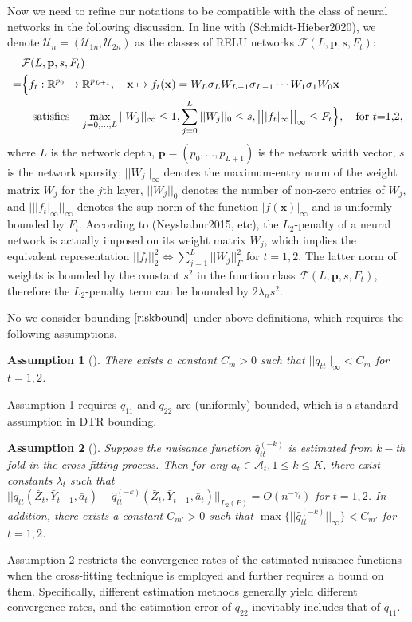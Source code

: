 \documentclass[10pt]{article}
\newtheorem{ass}{Assumption}
\theoremstyle{remark} \newtheorem{rem}{Remark}
\begin{document}
Now we need to refine our notations to be compatible with the class of neural networks in the following discussion.
In line with (Schmidt-Hieber2020), we denote $\mathcal{U}_n=(\mathcal{U}_{1n},\mathcal{U}_{2n})$ as the classes of RELU networks $\mathcal{F}(L,\mathbf{p},s,F_{t})$:
\begin{align}
    &\mathcal{F}(L,\mathbf{p},s,F_{t}) \notag\\
    =& \Big\{f_{t}: \mathbb{R}^{p_0}\to\mathbb{R}^{p_{L+1}},\quad \mathbf{x} \mapsto f_t(\mathbf{x})=W_L\sigma_L W_{L-1}\sigma_{L-1} \cdots W_1\sigma_1W_0\mathbf{x} \\
    &\text{\quad satisfies\quad} \max_{j=0,\dots,L}||W_j||_\infty \leq 1, \sum_{j=0}^L||W_j||_0 \leq s, \big|\big| |f_t|_\infty \big|\big|_{\infty} \leq F_t \Big\}, \text{\quad for $t$=1,2},
\end{align}
where $L$ is the network depth, $\mathbf{p}=(p_0,\dots,p_{L+1})$ is the network width vector, $s$ is the network sparsity;
$||W_j||_\infty$ denotes the maximum-entry norm of the weight matrix $W_j$ for the $j$th layer, $||W_j||_0$ denotes the number of non-zero entries of $W_j$, and $\big|\big| |f_t|_\infty \big|\big|_{\infty}$ denotes the sup-norm of the function $|f(\mathbf{x})|_\infty$ and is uniformly bounded by $F_t$.
According to (Neyshabur2015, etc), the $L_2$-penalty of a neural network is actually imposed on its weight matrix $W_j$, which implies the equivalent representation $|| f_{t}||_{2}^2  \Longleftrightarrow \sum\limits_{j=1}^L ||W_j||_F^2$ for $t=1,2$.
The latter norm of weights is bounded by the constant $s^2$ in the function class $\mathcal{F}(L,\mathbf{p},s,F_{t})$, therefore the $L_2$-penalty term can be bounded by $2\lambda_ns^2$.



No we consider bounding $\eqref{riskbound}$ under above definitions, which requires the following assumptions.
\begin{ass}[]
    There exists a constant $C_m > 0$ such that $||q_{tt}||_\infty < C_m$ for $t=1,2$. \label{assbound1}
\end{ass}
Assumption \ref{assbound1} requires $q_{11}$ and $q_{22}$ are (uniformly) bounded, which is a standard assumption in DTR bounding.

\begin{ass}[]
    Suppose the nuisance function $\hat q_{tt}^{(-k)}$ is estimated from $k-$th fold in the cross fitting process. Then for any $\bar a_t \in \mathcal{A}_t, 1\leq k\leq K$, there exist constants $\lambda_t$ such that $||q_{tt}(\bar Z_t, \bar Y_{t-1}, \bar a_t) - \hat q_{tt}^{(-k)}(\bar Z_t, \bar Y_{t-1}, \bar a_t)||_{L_2(P)} = O(n^{-\gamma_t})$ for $t=1,2$. In addition, there exists a constant $C_{m'} > 0$ such that $\max\{||\hat q_{tt}^{(-k)}||_\infty\} < C_{m'}$ for $t=1,2$. \label{assbound2}
\end{ass}
Assumption \ref{assbound2} restricts the convergence rates of the estimated nuisance functions when the cross-fitting technique is employed and further requires a bound on them. 
Specifically, different estimation methods generally yield different convergence rates, and the estimation error of $q_{22}$ inevitably includes that of $q_{11}$.
\end{document}

